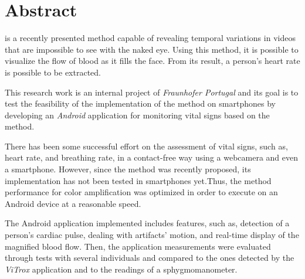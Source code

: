 \chapter*{Abstract}

\evm{} is a recently presented method capable of revealing temporal
variations in videos that are impossible to see with the naked eye.
Using this method, it is possible to visualize the flow of blood as
it fills the face. From its result, a person's heart rate is possible
to be extracted.

This research work is an internal project of \emph{Fraunhofer Portugal}
and its goal is to test the feasibility of the
implementation of the \evm{} method on smartphones by developing
an \emph{Android} application for monitoring vital signs based on
the \evm{} method.

There has been some successful effort on the assessment of vital
signs, such as, heart rate, and breathing rate, in a contact-free
way using a webcamera and even a smartphone. However, since the
\evm{} method was recently proposed, its implementation has not
been tested in smartphones yet.Thus, the \evm{} method performance
for color amplification was optimized in order to execute on an Android
device at a reasonable speed.

The Android application implemented includes features, such as,
detection of a person's cardiac pulse, dealing with artifacts' motion,
and real-time display of the magnified blood flow.
Then, the application measurements were evaluated through tests
with several individuals and compared to the ones detected by
the \emph{ViTrox} application and to the readings of a sphygmomanometer.






